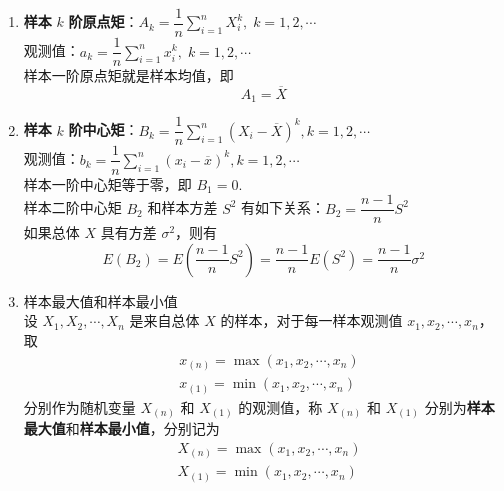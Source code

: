\begin{enumerate}
    \item \textbf{样本} $k$ \textbf{阶原点矩}：$A_k = \dfrac{1}{n} \displaystyle\sum_{i=1}^n X_i^k, \; k=1,2,\cdots$ \\[0.5em]
    观测值：$a_k = \dfrac{1}{n} \displaystyle\sum_{i=1}^n x_i^k, \; k=1,2,\cdots$ \\[0.5em]
    样本一阶原点矩就是样本均值，即
    $$
    A_1 = \overline{X}
    $$

    \item \textbf{样本} $k$ \textbf{阶中心矩}：$B_k = \dfrac{1}{n} \displaystyle\sum_{i=1}^n (X_i - \overline{X})^k, k=1,2,\cdots$ \\[0.5em]
    观测值：$b_k = \dfrac{1}{n} \displaystyle\sum_{i=1}^n (x_i - \overline{x})^k, k=1,2,\cdots$ \\[0.5em]
    样本一阶中心矩等于零，即 $B_1 = 0$. \\
    样本二阶中心矩 $B_2$ 和样本方差 $S^2$ 有如下关系：$B_2 = \dfrac{n-1}{n} S^2$\\
    如果总体 $X$ 具有方差 $\sigma^2$，则有
    $$
    E(B_2) = E(\dfrac{n-1}{n} S^2) = \dfrac{n-1}{n} E(S^2) = \dfrac{n-1}{n} \sigma^2
    $$

    \item 样本最大值和样本最小值 \\
    设 $X_1, X_2, \cdots, X_n$ 是来自总体 $X$ 的样本，对于每一样本观测值 $x_1, x_2, \cdots, x_n$，取
    $$
    \begin{aligned}
        & x_{(n)} = \max(x_1, x_2, \cdots, x_n) \\
        & x_{(1)} = \min(x_1, x_2, \cdots, x_n)
    \end{aligned}
    $$
    分别作为随机变量 $X_{(n)}$ 和 $X_{(1)}$ 的观测值，称 $X_{(n)}$ 和 $X_{(1)}$ 分别为\textbf{样本最大值}和\textbf{样本最小值}，分别记为
    $$
    \begin{aligned}
        & X_{(n)} = \max(x_1, x_2, \cdots, x_n) \\
        & X_{(1)} = \min(x_1, x_2, \cdots, x_n)
    \end{aligned}
    $$
\end{enumerate}